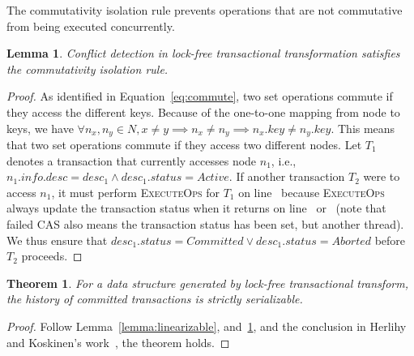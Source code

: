 \documentclass[]{sig-alternate-05-2015}
\newtheorem{theorem}{Theorem}
\newtheorem{lemma}{Lemma}
\begin{document}
The commutativity isolation rule prevents operations that are not commutative from being executed concurrently.
\begin{lemma}
    \label{lemma:commute}
    Conflict detection in lock-free transactional transformation satisfies the commutativity isolation rule.
\end{lemma}
\begin{proof}
    As identified in Equation~\ref{eq:commute}, two set operations commute if they access the different keys.
    Because of the one-to-one mapping from node to keys, we have $\forall n_x,n_y \in N, x \ne y \implies n_x \ne n_y \implies n_x.key \ne n_y.key$. 
    This means that two set operations commute if they access two different nodes.
    Let $T_1$ denotes a transaction that currently accesses node $n_1$, i.e., $n_1.info.desc = desc_1 \land desc_1.status = Active$.
    If another transaction $T_2$ were to access $n_1$, it must perform \textsc{ExecuteOps} for $T_1$ on line~ because \textsc{ExecuteOps} always update the transaction status when it returns on line~ or~ (note that failed CAS also means the transaction status has been set, but another thread).
    We thus ensure that $desc_1.status = Committed \lor desc_1.status = Aborted$ before $T_2$ proceeds. 
\end{proof}

\begin{theorem}
    For a data structure generated by lock-free transactional transform, the history of committed transactions is strictly serializable.
\end{theorem}
\begin{proof}
Follow Lemma~\ref{lemma:linearizable}, and~\ref{lemma:commute}, and the conclusion in Herlihy and Koskinen's work~\cite{herlihy2008transactional}, the theorem holds.
\end{proof}
\end{document}

